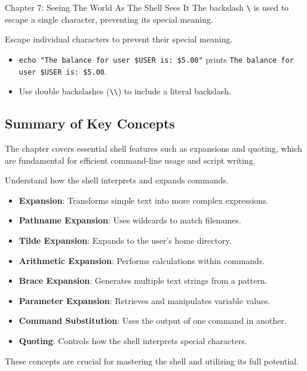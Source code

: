 \begin{notes}{Chapter 7: Seeing The World As The Shell Sees It}
    The backslash \texttt{\textbackslash} is used to escape a single character, preventing its special meaning.
    
    \begin{highlight}
    
    Escape individual characters to prevent their special meaning.
    
    \begin{itemize}
        \item \texttt{echo "The balance for user \$USER is: \$5.00"} prints \texttt{The balance for user \$USER is: \$5.00}.
        \item Use double backslashes (\texttt{\textbackslash{}\textbackslash{}}) to include a literal backslash.
    \end{itemize}
    
    \end{highlight}
    
    \subsection*{Summary of Key Concepts}
    
    The chapter covers essential shell features such as expansions and quoting, which are fundamental for efficient command-line usage and script writing.
    
    \begin{highlight}
    
    Understand how the shell interprets and expands commands.
    
    \begin{itemize}
        \item \textbf{Expansion}: Transforms simple text into more complex expressions.
        \item \textbf{Pathname Expansion}: Uses wildcards to match filenames.
        \item \textbf{Tilde Expansion}: Expands to the user's home directory.
        \item \textbf{Arithmetic Expansion}: Performs calculations within commands.
        \item \textbf{Brace Expansion}: Generates multiple text strings from a pattern.
        \item \textbf{Parameter Expansion}: Retrieves and manipulates variable values.
        \item \textbf{Command Substitution}: Uses the output of one command in another.
        \item \textbf{Quoting}: Controls how the shell interprets special characters.
    \end{itemize}
    
    These concepts are crucial for mastering the shell and utilizing its full potential.
    
    \end{highlight}
\end{notes}


